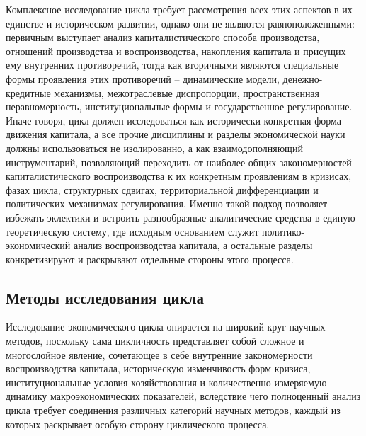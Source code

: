 Комплексное исследование цикла требует рассмотрения всех этих аспектов в их единстве и историческом развитии, однако они не являются равноположенными: первичным выступает анализ капиталистического способа производства, отношений производства и воспроизводства, накопления капитала и присущих ему внутренних противоречий, тогда как вторичными являются специальные формы проявления этих противоречий – динамические модели, денежно-кредитные механизмы, межотраслевые диспропорции, пространственная неравномерность, институциональные формы и государственное регулирование. Иначе говоря, цикл должен исследоваться как исторически конкретная форма движения капитала, а все прочие дисциплины и разделы экономической науки должны использоваться не изолированно, а как взаимодополняющий инструментарий, позволяющий переходить от наиболее общих закономерностей капиталистического воспроизводства к их конкретным проявлениям в кризисах, фазах цикла, структурных сдвигах, территориальной дифференциации и политических механизмах регулирования. Именно такой подход позволяет избежать эклектики и встроить разнообразные аналитические средства в единую теоретическую систему, где исходным основанием служит политико-экономический анализ воспроизводства капитала, а остальные разделы конкретизируют и раскрывают отдельные стороны этого процесса.

\subsection{Методы исследования цикла} %
Исследование экономического цикла опирается на широкий круг научных методов, поскольку сама цикличность представляет собой сложное и многослойное явление, сочетающее в себе внутренние закономерности воспроизводства капитала, историческую изменчивость форм кризиса, институциональные условия хозяйствования и количественно измеряемую динамику макроэкономических показателей, вследствие чего полноценный анализ цикла требует соединения различных категорий научных методов, каждый из которых раскрывает особую сторону циклического процесса.

